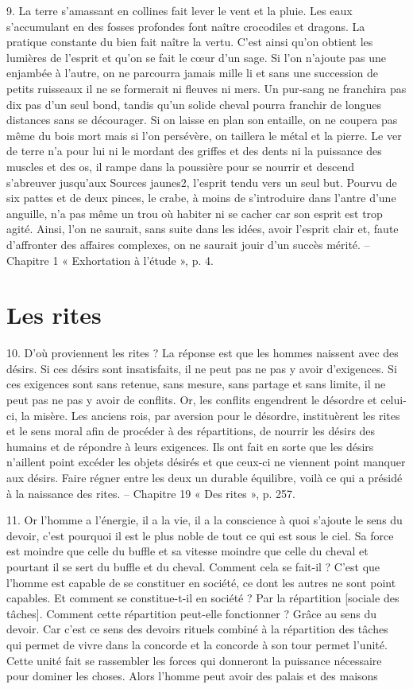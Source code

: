 9.	La terre s’amassant en collines fait lever le vent et la pluie. Les eaux s’accumulant en des fosses profondes font naître crocodiles et dragons. La pratique constante du bien fait naître la vertu. C’est ainsi qu’on obtient les lumières de l’esprit et qu’on se fait le cœur d’un sage. Si l’on n’ajoute pas une enjambée à l’autre, on ne parcourra jamais mille li et sans une succession de petits ruisseaux il ne se formerait ni fleuves ni mers. Un pur-sang ne franchira pas dix pas d’un seul bond, tandis qu’un solide cheval pourra franchir de longues distances sans se décourager. Si on laisse en plan son entaille, on ne coupera pas même du bois mort mais si l’on persévère, on taillera le métal et la pierre. Le ver de terre n’a pour lui ni le mordant des griffes et des dents ni la puissance des muscles et des os, il rampe dans la poussière pour se nourrir et descend s’abreuver jusqu’aux Sources jaunes2, l’esprit tendu vers un seul but. Pourvu de six pattes et de deux pinces, le crabe, à moins de s’introduire dans l’antre d’une anguille, n’a pas même un trou où habiter ni se cacher car son esprit est trop agité. Ainsi, l’on ne saurait, sans suite dans les idées, avoir l’esprit clair et, faute d’affronter des affaires complexes, on ne saurait jouir d’un succès mérité.
-- Chapitre 1 « Exhortation à l’étude », p. 4.


\section{Les rites
}

10.	D’où proviennent les rites ? La réponse est que les hommes naissent avec des désirs. Si ces désirs sont insatisfaits, il ne peut pas ne pas y avoir d’exigences. Si ces exigences sont sans retenue, sans mesure, sans partage et sans limite, il ne peut pas ne pas y avoir de conflits. Or, les conflits engendrent le désordre et celui-ci, la misère. Les anciens rois, par aversion pour le désordre, instituèrent les rites et le sens moral afin de procéder à des répartitions, de nourrir les désirs des humains et de répondre à leurs exigences. Ils ont fait en sorte que les désirs n’aillent point excéder les objets désirés et que ceux-ci ne viennent point manquer aux désirs. Faire régner entre les deux un durable équilibre, voilà ce qui a présidé à la naissance des rites.
-- Chapitre 19 « Des rites », p. 257.

11.	Or l’homme a l’énergie, il a la vie, il a la conscience à quoi s’ajoute le sens du devoir, c’est pourquoi il est le plus noble de tout ce qui est sous le ciel. Sa force est moindre que celle du buffle et sa vitesse moindre que celle du cheval et pourtant il se sert du buffle et du cheval. Comment cela se fait-il ? C’est que l’homme est capable de se constituer en société, ce dont les autres ne sont point capables. Et comment se constitue-t-il en société ? Par la répartition [sociale des tâches]. Comment cette répartition peut-elle fonctionner ? Grâce au sens du devoir. Car c’est ce sens des devoirs rituels combiné à la répartition des tâches qui permet de vivre dans la concorde et la concorde à son tour permet l’unité. Cette unité fait se rassembler les forces qui donneront la puissance nécessaire pour dominer les choses. Alors l’homme peut avoir des palais et des maisons

